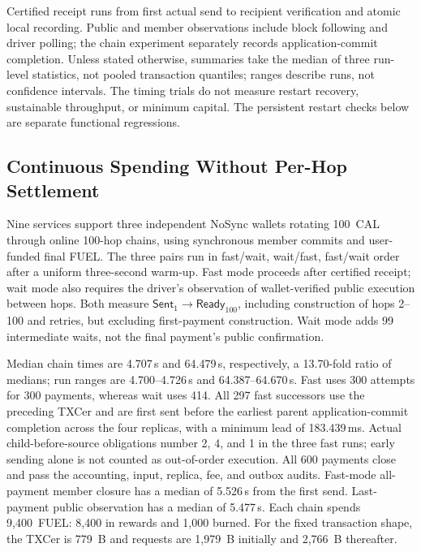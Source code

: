 Certified receipt runs from first actual send to recipient verification
and atomic local recording. Public and member observations include
block following and driver polling; the chain experiment separately records
application-commit completion. Unless stated otherwise, summaries take
the median of three run-level statistics, not pooled transaction
quantiles; ranges describe runs, not confidence intervals. The timing trials do not measure restart recovery, sustainable
throughput, or minimum capital. The persistent restart checks below
are separate functional regressions.


\subsection{Continuous Spending Without Per-Hop Settlement}
\label{sec:eval-continuation}

Nine services support three independent NoSync wallets rotating 100~CAL through online
100-hop chains, using synchronous member commits and user-funded
final FUEL. The three pairs run in fast/wait, wait/fast, fast/wait order after a uniform three-second warm-up. Fast mode proceeds after certified receipt; wait mode
also requires the driver's observation of wallet-verified public
execution between hops. Both measure
$\mathsf{Sent}_1 \rightarrow \mathsf{Ready}_{100}$, including
construction of hops 2--100 and retries, but excluding first-payment
construction. Wait mode adds 99 intermediate
waits, not the final payment's public confirmation.

Median chain times are 4.707\,s and 64.479\,s, respectively,
a 13.70-fold ratio of medians; run ranges are 4.700--4.726\,s
and 64.387--64.670\,s. Fast uses 300 attempts for 300 payments,
whereas wait uses 414. All 297 fast successors use the preceding
TXCer and are first sent before the earliest parent
application-commit completion across the four replicas, with a
minimum lead of 183.439\,ms. Actual child-before-source obligations
number 2, 4, and 1 in the three fast runs; early sending alone is
not counted as out-of-order execution. All 600 payments close and
pass the accounting, input, replica, fee, and outbox audits.
Fast-mode all-payment member closure has a median of 5.526\,s
from the first send. Last-payment public observation has a median of 5.477\,s. Each chain spends 9,400~FUEL: 8,400 in rewards and 1,000 burned. For the fixed
transaction shape, the TXCer is 779~B and requests are 1,979~B
initially and 2,766~B thereafter.

